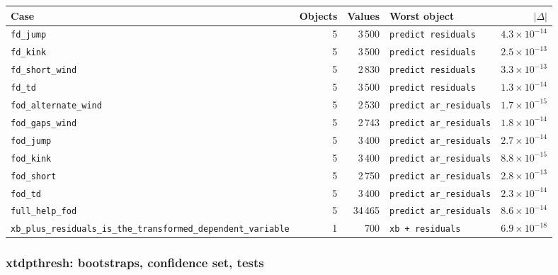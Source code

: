 \documentclass[
  10.5pt,
  a4paper,
]{article}
\begin{document}
\begin{longtable}{@{}p{3.6cm}rrp{4.9cm}r@{}}
\toprule
Case & Objects & Values & Worst object & $|\Delta|$ \\
\midrule
\endhead
\texttt{fd\_\allowbreak{}jump} & 5 & 3\,500 & \texttt{predict residuals} & $4.3\times10^{-14}$ \\
\texttt{fd\_\allowbreak{}kink} & 5 & 3\,500 & \texttt{predict residuals} & $2.5\times10^{-13}$ \\
\texttt{fd\_\allowbreak{}short\_\allowbreak{}wind} & 5 & 2\,830 & \texttt{predict residuals} & $3.3\times10^{-13}$ \\
\texttt{fd\_\allowbreak{}td} & 5 & 3\,500 & \texttt{predict residuals} & $1.3\times10^{-14}$ \\
\texttt{fod\_\allowbreak{}alternate\_\allowbreak{}wind} & 5 & 2\,530 & \texttt{predict ar\_\allowbreak{}residuals} & $1.7\times10^{-15}$ \\
\texttt{fod\_\allowbreak{}gaps\_\allowbreak{}wind} & 5 & 2\,743 & \texttt{predict ar\_\allowbreak{}residuals} & $1.8\times10^{-14}$ \\
\texttt{fod\_\allowbreak{}jump} & 5 & 3\,400 & \texttt{predict ar\_\allowbreak{}residuals} & $2.7\times10^{-14}$ \\
\texttt{fod\_\allowbreak{}kink} & 5 & 3\,400 & \texttt{predict ar\_\allowbreak{}residuals} & $8.8\times10^{-15}$ \\
\texttt{fod\_\allowbreak{}short} & 5 & 2\,750 & \texttt{predict ar\_\allowbreak{}residuals} & $2.8\times10^{-13}$ \\
\texttt{fod\_\allowbreak{}td} & 5 & 3\,400 & \texttt{predict ar\_\allowbreak{}residuals} & $2.3\times10^{-14}$ \\
\texttt{full\_\allowbreak{}help\_\allowbreak{}fod} & 5 & 34\,465 & \texttt{predict ar\_\allowbreak{}residuals} & $8.6\times10^{-14}$ \\
\texttt{xb\_\allowbreak{}plus\_\allowbreak{}residuals\_\allowbreak{}is\_\allowbreak{}the\_\allowbreak{}transformed\_\allowbreak{}dependent\_\allowbreak{}variable} & 1 & 700 & \texttt{xb + residuals} & $6.9\times10^{-18}$ \\
\bottomrule
\end{longtable}

\subsubsection*{xtdpthresh: bootstraps, confidence set, tests}
\end{document}
